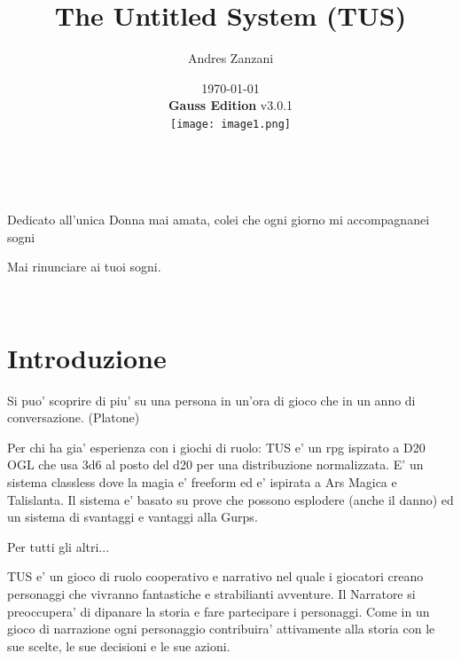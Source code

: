\documentclass[a4paper,11pt,twoside,openany]{dndbook}
\begin{document}
\title{The Untitled System (TUS)}
\date{\today\\\textbf{Gauss Edition} v3.0.1\\\texttt{[image: image1.png]}}
\author{Andres Zanzani}
\maketitle
\thispagestyle{empty}

\newpage~\newpage~




Dedicato all'unica Donna mai amata, colei che ogni giorno mi accompagnanei sogni

Mai rinunciare ai tuoi sogni.
\thispagestyle{empty}

\newpage~\thispagestyle{empty}%

\setcounter{page}{1}

\tableofcontents{}

\pagebreak{}

\section{Introduzione}

\pagestyle{plain} 
\begin{quotebox}Si puo' scoprire di piu' su una persona in un'ora di gioco che in un anno di conversazione. (Platone)
\end{quotebox}

Per chi ha gia' esperienza con i giochi di ruolo: TUS e' un rpg ispirato a D20 OGL che usa 3d6 al posto del d20 per una distribuzione normalizzata. E' un sistema classless dove la magia e' freeform ed e' ispirata a Ars Magica e Talislanta. Il sistema e' basato su prove che possono esplodere (anche il danno) ed un sistema di svantaggi e vantaggi alla Gurps. 

Per tutti gli altri...

TUS e' un gioco di ruolo cooperativo e narrativo nel quale i giocatori creano personaggi che vivranno fantastiche e strabilianti avventure. Il Narratore si preoccupera' di dipanare la storia e fare partecipare i personaggi. Come in un gioco di narrazione ogni personaggio contribuira' attivamente alla storia con le sue scelte, le sue decisioni e le sue azioni.
\end{document}
